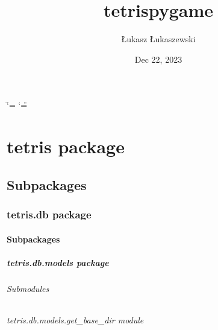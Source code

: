 \documentclass[letterpaper,10pt,english]{sphinxmanual}
\title{tetris\sphinxhyphen{}pygame}
\date{Dec 22, 2023}
\author{Łukasz Łukaszewski}
\begin{document}
\ifdefined\shorthandoff
  \ifnum\catcode`\=\string=\active\shorthandoff{=}\fi
  \ifnum\catcode`\"=\active{}\fi
\fi

\pagestyle{empty}
\sphinxmaketitle
\pagestyle{plain}
\sphinxtableofcontents
\pagestyle{normal}
\label{\detokenize{index::doc}}


\sphinxstepscope


\chapter{tetris package}
\label{\detokenize{tetris:tetris-package}}\label{\detokenize{tetris::doc}}

\section{Subpackages}
\label{\detokenize{tetris:subpackages}}
\sphinxstepscope


\subsection{tetris.db package}
\label{\detokenize{tetris.db:tetris-db-package}}\label{\detokenize{tetris.db::doc}}

\subsubsection{Subpackages}
\label{\detokenize{tetris.db:subpackages}}
\sphinxstepscope


\paragraph{tetris.db.models package}
\label{\detokenize{tetris.db.models:tetris-db-models-package}}\label{\detokenize{tetris.db.models::doc}}

\subparagraph{Submodules}
\label{\detokenize{tetris.db.models:submodules}}
\sphinxstepscope


\subparagraph{tetris.db.models.get\_base\_dir module}
\label{\detokenize{tetris.db.models.get_base_dir:module-tetris.db.models.get_base_dir}}\label{\detokenize{tetris.db.models.get_base_dir:tetris-db-models-get-base-dir-module}}\label{\detokenize{tetris.db.models.get_base_dir::doc}}
\sphinxstepscope
\end{document}
